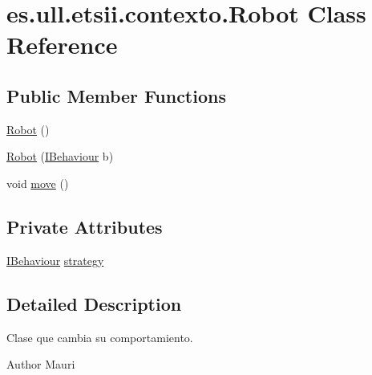\hypertarget{classes_1_1ull_1_1etsii_1_1contexto_1_1_robot}{\section{es.\-ull.\-etsii.\-contexto.\-Robot Class Reference}
\label{classes_1_1ull_1_1etsii_1_1contexto_1_1_robot}
}
\subsection*{Public Member Functions}
\begin{DoxyCompactItemize}
\item 
\hyperlink{classes_1_1ull_1_1etsii_1_1contexto_1_1_robot_a0d7b2089d4e09dd35a6f5c18a2b5297f}{Robot} ()
\item 
\hyperlink{classes_1_1ull_1_1etsii_1_1contexto_1_1_robot_a2ef4413c2c395c55ad9511aab22c27b5}{Robot} (\hyperlink{interfacees_1_1ull_1_1etsii_1_1estrategias_1_1_i_behaviour}{I\-Behaviour} b)
\item 
void \hyperlink{classes_1_1ull_1_1etsii_1_1contexto_1_1_robot_aaec45e06f689fec583cf168ed28f2d59}{move} ()
\end{DoxyCompactItemize}
\subsection*{Private Attributes}
\begin{DoxyCompactItemize}
\item 
\hyperlink{interfacees_1_1ull_1_1etsii_1_1estrategias_1_1_i_behaviour}{I\-Behaviour} \hyperlink{classes_1_1ull_1_1etsii_1_1contexto_1_1_robot_aebafde0ad8d25d829a8ce4f8287c262f}{strategy}
\end{DoxyCompactItemize}


\subsection{Detailed Description}
Clase que cambia su comportamiento. \begin{DoxyAuthor}{Author}
Mauri 
\end{DoxyAuthor}


